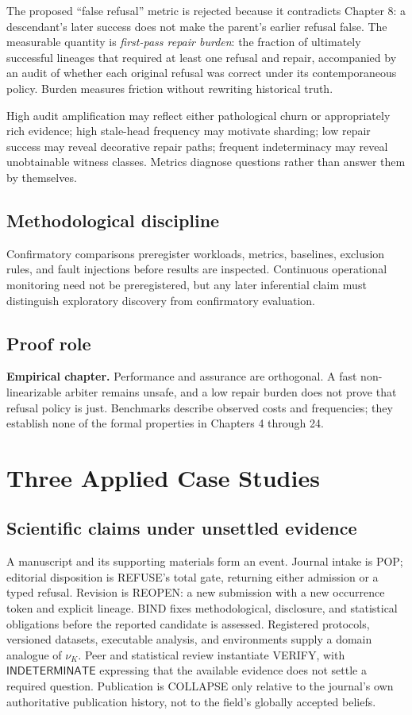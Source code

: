 \documentclass[11pt,openany]{book}
\newcommand{\Indeterminate}{\mathsf{INDETERMINATE}}
\begin{document}
The proposed “false refusal” metric is rejected because it contradicts Chapter
8: a descendant's later success does not make the parent's earlier refusal
false. The measurable quantity is \emph{first-pass repair burden}: the fraction
of ultimately successful lineages that required at least one refusal and
repair, accompanied by an audit of whether each original refusal was correct
under its contemporaneous policy. Burden measures friction without rewriting
historical truth.

High audit amplification may reflect either pathological churn or appropriately
rich evidence; high stale-head frequency may motivate sharding; low repair
success may reveal decorative repair paths; frequent indeterminacy may reveal
unobtainable witness classes. Metrics diagnose questions rather than answer
them by themselves.

\section{Methodological discipline}
Confirmatory comparisons preregister workloads, metrics, baselines, exclusion
rules, and fault injections before results are inspected. Continuous operational
monitoring need not be preregistered, but any later inferential claim must
distinguish exploratory discovery from confirmatory evaluation.

\section{Proof role}
\textbf{Empirical chapter.} Performance and assurance are orthogonal. A fast
non-linearizable arbiter remains unsafe, and a low repair burden does not prove
that refusal policy is just. Benchmarks describe observed costs and frequencies;
they establish none of the formal properties in Chapters 4 through 24.

\chapter{Three Applied Case Studies}
\section{Scientific claims under unsettled evidence}
A manuscript and its supporting materials form an event. Journal intake is
POP; editorial disposition is REFUSE's total gate, returning either admission
or a typed refusal. Revision is REOPEN: a new submission with a new occurrence
token and explicit lineage. BIND fixes methodological, disclosure, and
statistical obligations before the reported candidate is assessed. Registered
protocols, versioned datasets, executable analysis, and environments supply a
domain analogue of \(\nu_K\). Peer and statistical review instantiate VERIFY,
with \(\Indeterminate\) expressing that the available evidence does not settle
a required question. Publication is COLLAPSE only relative to the journal's
own authoritative publication history, not to the field's globally accepted
beliefs.
\end{document}

